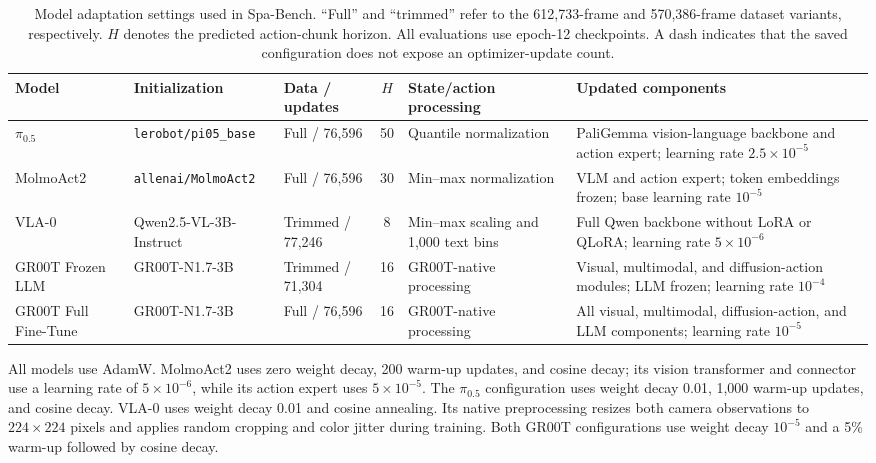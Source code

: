 \documentclass[conference]{IEEEtran}
\begin{document}
\begin{table}[t]
\centering
\scriptsize
\setlength{\tabcolsep}{3pt}
\renewcommand{\arraystretch}{1.08}
\caption{Model adaptation settings used in Spa-Bench. ``Full'' and ``trimmed'' refer to the 612,733-frame and 570,386-frame dataset variants, respectively. $H$ denotes the predicted action-chunk horizon. All evaluations use epoch-12 checkpoints. A dash indicates that the saved configuration does not expose an optimizer-update count.}
\label{tab:training_configuration}
\begin{tabularx}{\textwidth}{
    p{}
    p{}
    p{}
    c
    p{}
    X}
\toprule
\textbf{Model} &
\textbf{Initialization} &
\textbf{Data / updates} &
\textbf{$H$} &
\textbf{State/action processing} &
\textbf{Updated components} \\
\midrule

$\pi_{0.5}$ &
\texttt{lerobot/pi05\_base} &
Full / 76,596 &
50 &
Quantile normalization &
PaliGemma vision-language backbone and action expert; learning rate $2.5\times10^{-5}$ \\

MolmoAct2 &
\texttt{allenai/MolmoAct2} &
Full / 76,596 &
30 &
Min--max normalization &
VLM and action expert; token embeddings frozen; base learning rate $10^{-5}$ \\

VLA-0 &
Qwen2.5-VL-3B-Instruct &
Trimmed / 77,246 &
8 &
Min--max scaling and 1,000 text bins &
Full Qwen backbone without LoRA or QLoRA; learning rate $5\times10^{-6}$ \\

GR00T Frozen LLM &
GR00T-N1.7-3B &
Trimmed / 71,304 &
16 &
GR00T-native processing &
Visual, multimodal, and diffusion-action modules; LLM frozen; learning rate $10^{-4}$ \\

GR00T Full Fine-Tune &
GR00T-N1.7-3B &
Full / 76,596 &
16 &
GR00T-native processing &
All visual, multimodal, diffusion-action, and LLM components; learning rate $10^{-5}$ \\

\bottomrule
\end{tabularx}
\end{table}

All models use AdamW. MolmoAct2 uses zero weight decay, 200 warm-up updates, and cosine decay; its vision transformer and connector use a learning rate of $5\times10^{-6}$, while its action expert uses $5\times10^{-5}$. The $\pi_{0.5}$ configuration uses weight decay 0.01, 1,000 warm-up updates, and cosine decay. VLA-0 uses weight decay 0.01 and cosine annealing. Its native preprocessing resizes both camera observations to $224\times224$ pixels and applies random cropping and color jitter during training. Both GR00T configurations use weight decay $10^{-5}$ and a 5\% warm-up followed by cosine decay.
\end{document}
